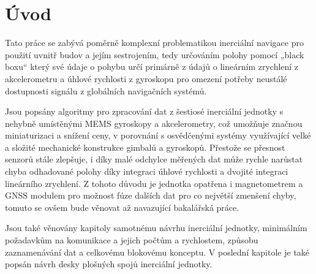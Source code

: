 \chapter*{Úvod}
{}

Tato práce se zabývá poměrně komplexní problematikou inerciální navigace pro použití uvnitř budov a jejím sestrojením, tedy určováním polohy pomocí „black boxu“ který své údaje o pohybu určí primárně z údajů o lineárním zrychlení z akcelerometru a úhlové rychlosti z gyroskopu pro omezení potřeby neustálé dostupnosti signálu z globálních navigačních systémů.

Jsou popsány algoritmy pro zpracování dat z šestiosé inerciální jednotky s nehybně umístěnými \ac{MEMS} gyroskopy a akcelerometry, což umožňuje značnou miniaturizaci a snížení ceny, v porovnání s osvědčenými systémy využívající velké a složité mechanické konstrukce gimbalů a gyroskopů. Přestože se přesnost senzorů stále zlepšuje, i díky malé odchylce měřených dat může rychle narůstat chyba odhadované polohy díky integraci úhlové rychlosti a dvojité integraci lineárního zrychlení. Z tohoto důvodu je jednotka opatřena i magnetometrem a \ac{GNSS} modulem pro možnost fúze dalších dat pro co největší zmenšení chyby, tomuto se ovšem bude věnovat až navazující bakalářská práce.

Jsou také věnovány kapitoly samotnému návrhu inerciální jednotky, minimálním požadavkům na komunikace a jejich počtům a rychlostem, způsobu zaznamenávání dat a celkovému blokovému konceptu. V poslední kapitole je také popsán návrh desky plošných spojů inerciální jednotky. 